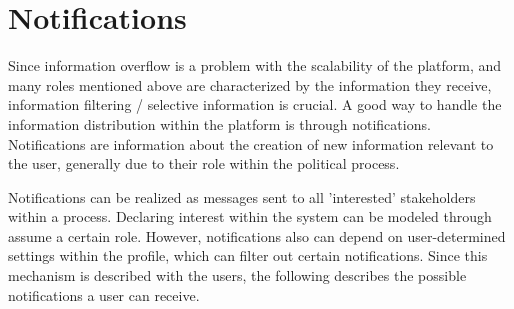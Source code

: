 

\section{Notifications}
\label{sec:Notifications}
Since information overflow is a problem with the scalability of the platform, and many roles mentioned above are characterized by the information they receive, information filtering / selective information is crucial. A good way to handle the information distribution within the platform is through notifications. Notifications are information about the creation of new information relevant to the user, generally due to their role within the political process.

Notifications can be realized as messages sent to all 'interested' stakeholders within a process. Declaring interest within the system can be modeled through assume a certain role. However, notifications also can depend on user-determined settings within the profile, which can filter out certain notifications. Since this mechanism is described with the users, the following describes the possible notifications a user can receive.


